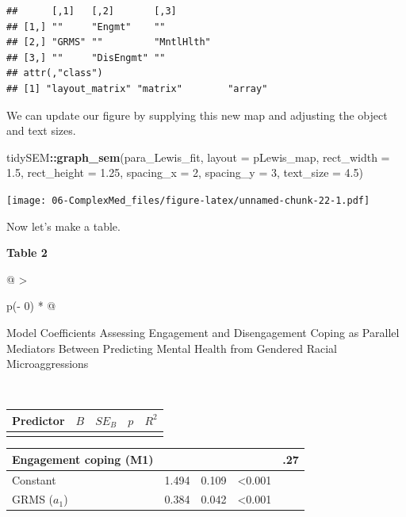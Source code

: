 \documentclass[
  11pt,
]{book}
\newenvironment{Shaded}{\begin{snugshade}}{\end{snugshade}}
\newcommand{\AttributeTok}[1]{\textcolor[rgb]{0.27,0.27,0.27}{#1}}
\newcommand{\DecValTok}[1]{\textcolor[rgb]{0.06,0.06,0.06}{#1}}
\newcommand{\FloatTok}[1]{\textcolor[rgb]{0.06,0.06,0.06}{#1}}
\newcommand{\FunctionTok}[1]{\textcolor[rgb]{0.27,0.27,0.27}{\textbf{#1}}}
\newcommand{\NormalTok}[1]{#1}
\newcommand{\SpecialCharTok}[1]{\textcolor[rgb]{0.43,0.43,0.43}{\textbf{#1}}}
\begin{document}
\begin{verbatim}
##      [,1]   [,2]       [,3]      
## [1,] ""     "Engmt"    ""        
## [2,] "GRMS" ""         "MntlHlth"
## [3,] ""     "DisEngmt" ""        
## attr(,"class")
## [1] "layout_matrix" "matrix"        "array"
\end{verbatim}

We can update our figure by supplying this new map and adjusting the object and text sizes.

\begin{Shaded}
\begin{Highlighting}[]
\NormalTok{tidySEM}\SpecialCharTok{::}\FunctionTok{graph\_sem}\NormalTok{(para\_Lewis\_fit, }\AttributeTok{layout =}\NormalTok{ pLewis\_map, }\AttributeTok{rect\_width =} \FloatTok{1.5}\NormalTok{,}
    \AttributeTok{rect\_height =} \FloatTok{1.25}\NormalTok{, }\AttributeTok{spacing\_x =} \DecValTok{2}\NormalTok{, }\AttributeTok{spacing\_y =} \DecValTok{3}\NormalTok{, }\AttributeTok{text\_size =} \FloatTok{4.5}\NormalTok{)}
\end{Highlighting}
\end{Shaded}

\texttt{[image: 06-ComplexMed\_files/figure-latex/unnamed-chunk-22-1.pdf]}

Now let's make a table.

\textbf{Table 2 }

\begin{longtable}[]{@{}
  >{\raggedright\arraybackslash}p{(\columnwidth - 0\tabcolsep) * }@{}}
\toprule\noalign{}
\begin{minipage}[b]{\linewidth}\raggedright
Model Coefficients Assessing Engagement and Disengagement Coping as Parallel Mediators Between Predicting Mental Health from Gendered Racial Microaggressions
\end{minipage} \\
\midrule\noalign{}
\endhead
\bottomrule\noalign{}
\endlastfoot
\end{longtable}

\begin{longtable}[]{@{}lcccr@{}}
\toprule\noalign{}
Predictor & \(B\) & \(SE_{B}\) & \(p\) & \(R^2\) \\
\midrule\noalign{}
\endhead
\bottomrule\noalign{}
\endlastfoot
\end{longtable}

\begin{longtable}[]{@{}lrrrr@{}}
\toprule\noalign{}
Engagement coping (M1) & & & & .27 \\
\midrule\noalign{}
\endhead
\bottomrule\noalign{}
\endlastfoot
Constant & 1.494 & 0.109 & \textless0.001 & \\
GRMS (\(a_1\)) & 0.384 & 0.042 & \textless0.001 & \\
\end{longtable}
\end{document}
